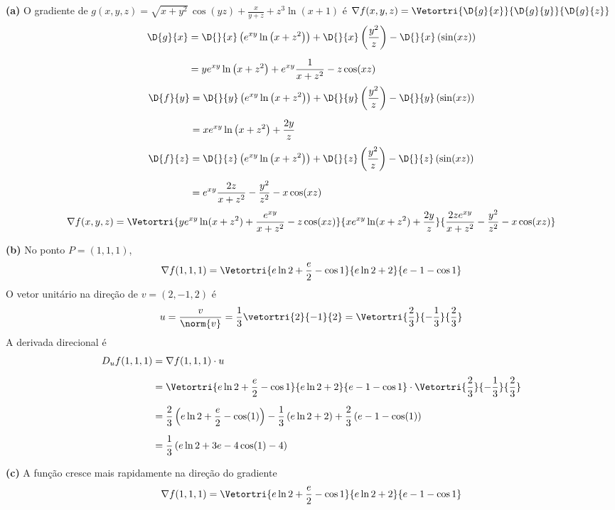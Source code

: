 \documentclass[a4paper,12pt,fleqn]{article}
\begin{document}
\begin{answer}
  \textbf{(a)} O gradiente de
  \(
    g(x, y, z)=\sqrt{x+y^2}\,\cos(yz)+\frac{x}{y+z}+z^3\ln(x+1)
  \)
  é
  \(
    \nabla f(x, y, z)
    = \Vetortri{\D{g}{x}}{\D{g}{y}}{\D{g}{z}}
  \)
  \begin{align*}
    \D{g}{x}
    & = \D{}{x} \left( e^{xy}\ln\left(x+z^2\right) \right)
      + \D{}{x} \left( \frac{y^2}{z} \right)
      - \D{}{x} \left( \sin(xz) \right)
    \\[2mm]
    & = ye^{xy}\ln\left(x+z^2\right)
      + e^{xy}\frac{1}{x+z^2}
      - z\cos(xz)
  \end{align*}
  \begin{align*}
    \D{f}{y}
    & = \D{}{y} \left( e^{xy}\ln\left(x+z^2\right) \right)
      + \D{}{y} \left( \frac{y^2}{z} \right)
      - \D{}{y} \left( \sin(xz) \right)
    \\[2mm]
    & = xe^{xy}\ln\left(x+z^2\right)
      + \frac{2y}{z}
  \end{align*}
  \begin{align*}
    \D{f}{z}
    & = \D{}{z} \left( e^{xy}\ln\left(x+z^2\right) \right)
      + \D{}{z} \left( \frac{y^2}{z} \right)
      - \D{}{z} \left( \sin(xz) \right)
    \\[2mm]
    & = e^{xy}\frac{2z}{x+z^2}
      - \frac{y^2}{z^2}
      - x\cos(xz)
  \end{align*}
  \[
    \nabla f(x,y,z)
    = \Vetortri{
    ye^{xy}\ln(x+z^2)
    +
    \frac{e^{xy}}{x+z^2}
    -
    z\cos(xz)}{
    xe^{xy}\ln(x+z^2)
    +
    \frac{2y}{z}}{
    \frac{2ze^{xy}}{x+z^2}
    -
    \frac{y^2}{z^2}
    -
    x\cos(xz)}
  \]

  \textbf{(b)} No ponto \(P=(1, 1, 1)\),
  \[
    \nabla f(1, 1, 1)
    = \Vetortri{e\ln2+\frac{e}{2}-\cos1}{e\ln2+2}{e-1-\cos1}
  \]
  O vetor unitário na direção de
  \(
    v = (2, -1, 2)
  \)
  é
  \[
    u
    = \frac{v}{\norm{v}}
    = \frac{1}{3} \vetortri{2}{-1}{2}
    = \Vetortri{\frac{2}{3}}{-\frac{1}{3}}{\frac{2}{3}}
  \]
  A derivada direcional é
  \begin{align*}
    D_{u} f(1, 1, 1)
    & = \nabla f(1, 1, 1) \cdot u                                        \\[2mm]
    & = \Vetortri{e\ln2+\frac{e}{2}-\cos1}{e\ln2+2}{e-1-\cos1} \cdot
        \Vetortri{\frac{2}{3}}{-\frac{1}{3}}{\frac{2}{3}}                \\[2mm]
    & = \frac{2}{3} \left( e\ln 2 + \frac{e}{2} - \cos(1) \right)
      - \frac{1}{3} \left( e\ln 2 + 2 \right)
      + \frac23 \left( e - 1 - \cos(1) \right)                           \\[2mm]
    & = \frac{1}{3} \left( e\ln 2 + 3e - 4\cos(1) - 4 \right)
  \end{align*}

  \textbf{(c)} A função cresce mais rapidamente na direção do gradiente
  \[
    \nabla f(1, 1, 1)
    =\Vetortri{e\ln2+\frac{e}{2}-\cos1}{e\ln2+2}{e-1-\cos1}
  \]
\end{answer}
\end{document}
